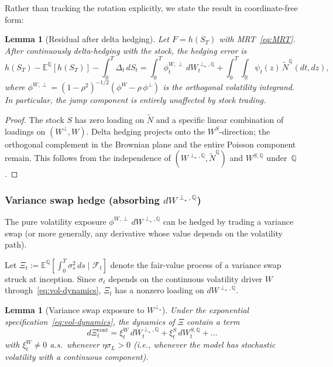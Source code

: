 \documentclass[11pt,a4paper]{article}
\theoremstyle{plain}
\newtheorem{lemma}[theorem]{Lemma}
\theoremstyle{definition}
\theoremstyle{remark}
\newcommand{\E}{\mathbb{E}}
\newcommand{\R}{\mathbb{R}}
\newcommand{\QQ}{\mathbb{Q}}
\newcommand{\F}{\mathcal{F}}
\newcommand{\Ntilde}{\widetilde{N}}
\begin{document}
Rather than tracking the rotation explicitly, we state the
result in coordinate-free form:

\begin{lemma}[Residual after delta hedging]\label{lem:after-delta}
Let $F = h(S_T)$ with MRT~\eqref{eq:MRT}.  After continuously
delta-hedging with the stock, the hedging error is
\begin{equation}\label{eq:delta-error}
  h(S_T) - \E^\QQ[h(S_T)]
  - \int_0^T \Delta_t\,dS_t
  = \int_0^T \phi_t^{W,\perp}\,dW_t^{\perp_\star,\QQ}
  + \int_0^T\!\!\int_\R
  \psi_t(z)\,\Ntilde^\QQ(dt,dz),
\end{equation}
where $\phi^{W,\perp} =
(1-\rho^2)^{-1/2}(\phi^W - \rho\,\phi^\perp)$ is the
orthogonal volatility integrand.  In particular, the jump
component is entirely unaffected by stock trading.
\end{lemma}

\begin{proof}
The stock $S$ has zero loading on $\Ntilde$ and a specific
linear combination of loadings on $(W^\perp, W)$.  Delta
hedging projects onto the $W^S$-direction; the orthogonal
complement in the Brownian plane and the entire Poisson
component remain.  This follows from the independence of
$(W^{\perp_\star,\QQ}, \Ntilde^\QQ)$ and $W^{S,\QQ}$
under~$\QQ$.
\end{proof}


\subsubsection{Variance swap hedge (absorbing $dW^{\perp_\star,\QQ}$)}

The pure volatility exposure $\phi^{W,\perp}\,dW^{\perp_\star,\QQ}$
can be hedged by trading a variance swap (or more generally, any
derivative whose value depends on the volatility path).

Let $\Xi_t := \E^\QQ[\int_0^T \sigma_s^2\,ds \mid \F_t]$ denote
the fair-value process of a variance swap struck at inception.
Since $\sigma_t$ depends on the continuous volatility driver $W$
through~\eqref{eq:vol-dynamics}, $\Xi_t$ has a nonzero loading
on $dW^{\perp_\star,\QQ}$.

\begin{lemma}[Variance swap exposure to $W^{\perp_\star}$]
\label{lem:xi-loading}
Under the exponential specification~\eqref{eq:vol-dynamics}, the
dynamics of $\Xi$ contain a term
\begin{equation}\label{eq:xi-continuous}
  d\Xi_t^{\mathrm{cont}} = \xi_t^W\,dW_t^{\perp_\star,\QQ}
  + \xi_t^S\,dW_t^{S,\QQ} + \ldots
\end{equation}
with $\xi_t^W \neq 0$ a.s.\ whenever $\eta\sigma_L > 0$
(i.e., whenever the model has stochastic volatility with a
continuous component).
\end{lemma}
\end{document}
